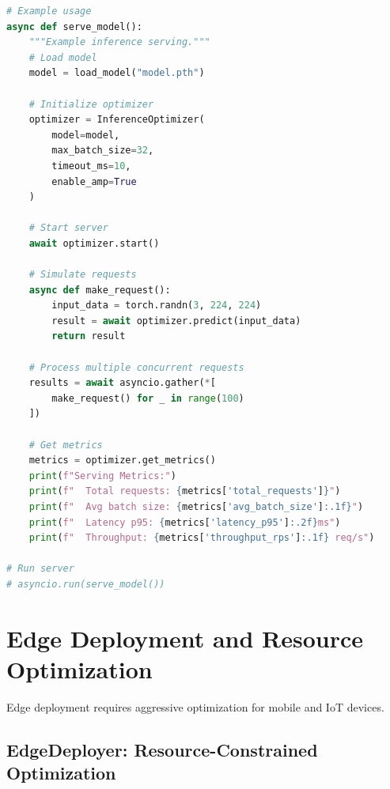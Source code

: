 \begin{lstlisting}[language=Python, caption={Production Inference Optimization}]
# Example usage
async def serve_model():
    """Example inference serving."""
    # Load model
    model = load_model("model.pth")

    # Initialize optimizer
    optimizer = InferenceOptimizer(
        model=model,
        max_batch_size=32,
        timeout_ms=10,
        enable_amp=True
    )

    # Start server
    await optimizer.start()

    # Simulate requests
    async def make_request():
        input_data = torch.randn(3, 224, 224)
        result = await optimizer.predict(input_data)
        return result

    # Process multiple concurrent requests
    results = await asyncio.gather(*[
        make_request() for _ in range(100)
    ])

    # Get metrics
    metrics = optimizer.get_metrics()
    print(f"Serving Metrics:")
    print(f"  Total requests: {metrics['total_requests']}")
    print(f"  Avg batch size: {metrics['avg_batch_size']:.1f}")
    print(f"  Latency p95: {metrics['latency_p95']:.2f}ms")
    print(f"  Throughput: {metrics['throughput_rps']:.1f} req/s")

# Run server
# asyncio.run(serve_model())
\end{lstlisting}

\section{Edge Deployment and Resource Optimization}

Edge deployment requires aggressive optimization for mobile and IoT devices.

\subsection{EdgeDeployer: Resource-Constrained Optimization}

